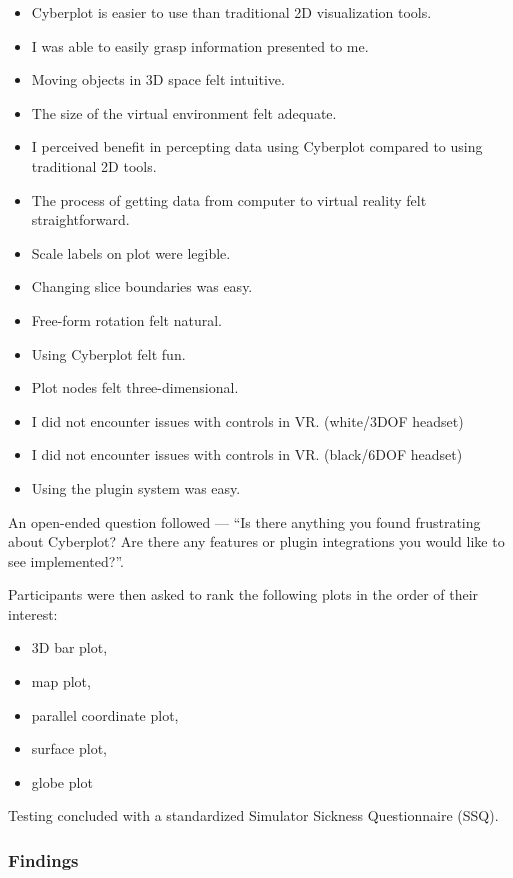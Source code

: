 \documentclass[thesis=M,english,hidelinks]{FITthesisXE}[2012/06/26]
\begin{document}
\begin{itemize}
\item Cyberplot is easier to use than traditional 2D visualization tools.
\item I was able to easily grasp information presented to me.
\item Moving objects in 3D space felt intuitive.
\item The size of the virtual environment felt adequate.
\item I perceived benefit in percepting data using Cyberplot compared to using traditional 2D tools.
\item The process of getting data from computer to virtual reality felt straightforward.
\item Scale labels on plot were legible.
\item Changing slice boundaries was easy.
\item Free-form rotation felt natural.
\item Using Cyberplot felt fun.
\item Plot nodes felt three-dimensional.
\item I did not encounter issues with controls in VR. (white/3DOF headset)
\item I did not encounter issues with controls in VR. (black/6DOF headset)
\item Using the plugin system was easy.
\end{itemize}

An open-ended question followed --- “Is there anything you found frustrating about Cyberplot? Are there any features or plugin integrations you would like to see implemented?”.

Participants were then asked to rank the following plots in the order of their interest:

\begin{itemize}
\item 3D bar plot,
\item map plot,
\item parallel coordinate plot,
\item surface plot,
\item globe plot
\end{itemize}

Testing concluded with a standardized Simulator Sickness Questionnaire (SSQ).\autocite{sickness}

\subsubsection{Findings}
\end{document}
